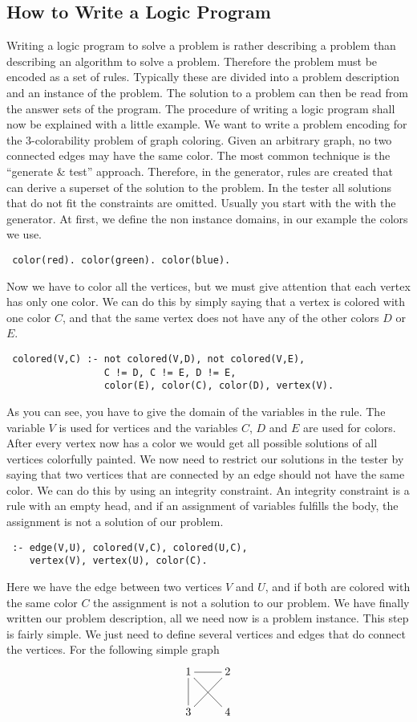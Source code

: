 \documentclass[a4paper,10pt]{article}
\begin{document}
\subsection{How to Write a Logic Program}
Writing a logic program to solve a problem is rather describing a problem than describing an algorithm to solve a problem.
Therefore the problem must be encoded as a set of rules.
Typically these are divided into a problem description and an instance of the problem.
The solution to a problem can then be read from the answer sets of the program.
The procedure of writing a logic program shall now be explained with a little example.
We want to write a problem encoding for the 3-colorability problem of graph coloring.
Given an arbitrary graph, no two connected edges may have the same color.
The most common technique is the ``generate \& test'' approach. Therefore, in the generator, rules are created that can derive a superset of the solution to the problem. In the tester all solutions that do not fit the constraints are omitted.
\newline
Usually you start with the with the generator.
At first, we define the non instance domains, in our example the colors we use.
\begin{verbatim}
 color(red). color(green). color(blue).
\end{verbatim}
Now we have to color all the vertices, but we must give attention that each vertex has only one color.
We can do this by simply saying that a vertex is colored with one color $C$, and that the same vertex does not have any of the other colors $D$ or $E$.
\begin{verbatim}
 colored(V,C) :- not colored(V,D), not colored(V,E),
                 C != D, C != E, D != E,
                 color(E), color(C), color(D), vertex(V).
\end{verbatim}
As you can see, you have to give the domain of the variables in the rule.
The variable $V$ is used for vertices and the variables $C$, $D$ and $E$ are used for colors.
After every vertex now has a color we would get all possible solutions of all vertices colorfully painted.
We now need to restrict our solutions in the tester by saying that two vertices that are connected by an edge should not have the same color.
We can do this by using an integrity constraint.
An integrity constraint is a rule with an empty head, and if an assignment of variables fulfills the body, the assignment is not a solution of our problem.
\begin{verbatim}
 :- edge(V,U), colored(V,C), colored(U,C),
    vertex(V), vertex(U), color(C).
\end{verbatim}
Here we have the edge between two vertices $V$ and $U$, and if both are colored with the same color $C$ the assignment is not a solution to our problem.
\newline
We have finally written our problem description, all we need now is a problem instance. This step is fairly simple.
We just need to define several vertices and edges that do connect the vertices.
For the following simple graph
\[
 \xymatrix{1\ar@{-}[dr]\ar@{-}[d]\ar@{-}[r]&2\ar@{-}[dl]\\
           3&4}
\]
\end{document}
